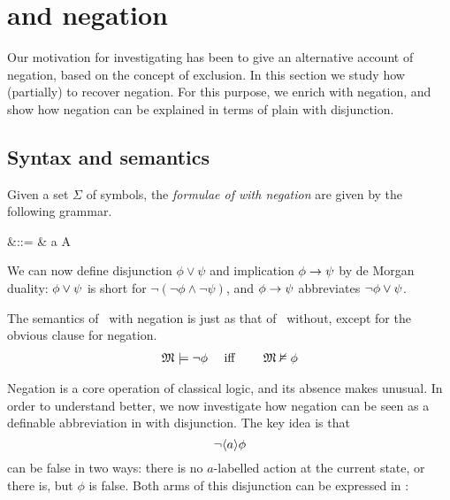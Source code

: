 \section{\Cathoristic{} and negation}\label{ELAndNegation}

\NI Our motivation for investigating \cathoristic{} has been to give an
alternative account of negation, based on the concept of exclusion.
In this section we study how (partially) to recover negation. For this
purpose, we enrich \cathoristic{} with negation, and show how negation
can be explained in terms of plain \cathoristic{} with disjunction.

\subsection{Syntax and semantics}

\begin{definition}
Given a set $\Sigma$ of symbols, the \emph{formulae of \cathoristic{}
  with negation} are given by the following grammar.
\begin{GRAMMAR}
  \phi 
     &\quad ::= \quad & 
   \top \fOr \bot \fOr \neg \phi \fOr \phi \land \psi \fOr \langle a \rangle \phi \fOr \fBang A 
\end{GRAMMAR}

\NI We can now define disjunction $\phi \lor \psi$ and implication
$\phi \rightarrow \psi$ by de Morgan duality: $\phi \lor \psi$ is short
for $\neg (\neg \phi \land \neg \psi )$, and $\phi \rightarrow \psi$  abbreviates
$\neg\phi \lor \psi$.
\end{definition}

The semantics of \cathoristic\ with negation is just as that of
\cathoristic\ without, except for the obvious clause for negation.
\begin{eqnarray*}
\frak{M} \models \neg \phi &\quad\mbox{ iff }\quad& \frak{M} \nvDash \phi  
\end{eqnarray*}

\NI Negation is a core operation of classical logic, and its absence makes
\cathoristic{} unusual. In order to understand \cathoristic{} better, we
now investigate how negation can be seen as a definable abbreviation
in \cathoristic{} with disjunction. The key idea is that 
\[
   \neg \langle a \rangle \phi
\]
can be false in two ways: there is no $a$-labelled action at the
current state, or there is, but $\phi$ is false. Both arms of this
disjunction can be expressed in \cathoristic{}:

